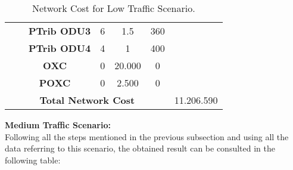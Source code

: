 \begin{table}[H]
\begin{tabular}{|c|c|c|c|c|c|c|}
                                    &                               & \textbf{PTrib ODU3} & 6                 & 1.5                 & 360           &                            \\ \cline{3-6}
                                    &                               & \textbf{PTrib ODU4} & 4                 & 1                   & 400           &                            \\ \cline{2-6}
                                    & \multicolumn{2}{c|}{\textbf{OXC}}                   & 0                 & 20.000              & 0             &                            \\ \cline{2-6}
                                    & \multicolumn{2}{c|}{\textbf{POXC}}                  & 0                 & 2.500               & 0             &                            \\ \hline
\multicolumn{6}{|c|}{\textbf{Total Network Cost}}                                                                                                   & 11.206.590                 \\ \hline
\end{tabular}
\caption{Network Cost for Low Traffic Scenario.}
\end{table}

\textbf{Medium Traffic Scenario:}\\

Following all the steps mentioned in the previous subsection and using all the data referring to this scenario, the obtained result can be consulted in the following table:

